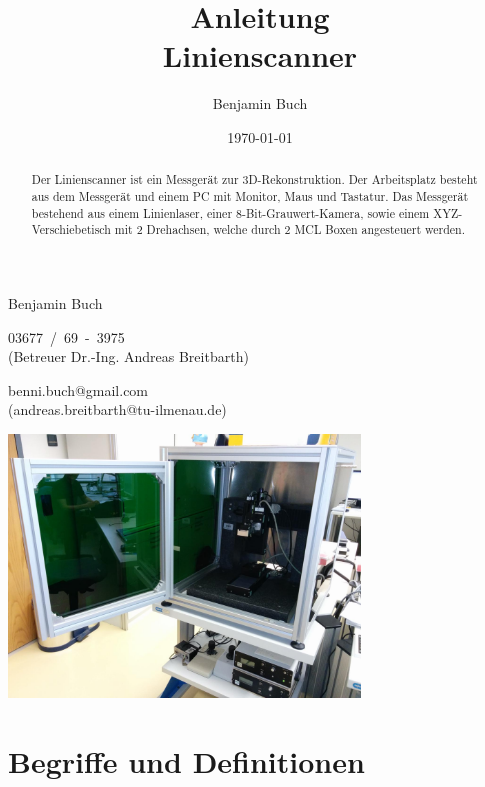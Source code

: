 \documentclass[a4paper,10pt]{scrartcl}
\title{Anleitung\\Linienscanner}
\author{\Large Benjamin Buch}
\date{\large \today}
\begin{document}
\maketitle

\begin{center}
\begin{minipage}{0.6\textwidth}
\begin{description}
  \large
  \item[Autor $\ \ $] Benjamin Buch
  \item[Telefon] 03677~/~69~-~3975\\(Betreuer Dr.-Ing. Andreas Breitbarth)
  \item[E-Mail] benni.buch@gmail.com\\(andreas.breitbarth@tu-ilmenau.de)
\end{description}
\end{minipage}
\end{center}

\bigskip

\begin{abstract}
Der Linienscanner ist ein Messgerät zur 3D-Rekonstruktion. Der Arbeitsplatz
besteht aus dem Messgerät und einem PC mit Monitor, Maus und Tastatur. Das
Messgerät bestehend aus einem Linienlaser, einer 8-Bit-Grauwert-Kamera, sowie
einem XYZ-Verschiebetisch mit 2 Drehachsen, welche durch 2 MCL Boxen angesteuert
werden.
\end{abstract}

\bigskip

\begin{center}
\includegraphics[width=0.7\textwidth]{include/IMG_20160412_140245.jpg}
\end{center}

\section{Begriffe und Definitionen}
\end{document}
